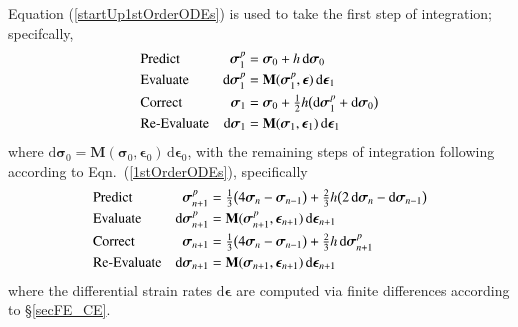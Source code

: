 Equation (\ref{startUp1stOrderODEs}) is used to take the first step of integration; specifcally, 
\begin{subequations}
    \notag
    \begin{align}
    \mbox{} & \text{Predict} & 
    \boldsymbol{\sigma}_1^p & = \boldsymbol{\sigma}_0 + h \, \mathrm{d} \boldsymbol{\sigma}_0 \\
    \mbox{} & \text{Evaluate} & 
    \mathrm{d} \boldsymbol{\sigma}^p_1 & = \mathbf{M} ( \boldsymbol{\sigma}_1^p ,
    \boldsymbol{\epsilon} ) \, \mathrm{d} \boldsymbol{\epsilon}_1 \\
    \mbox{} & \text{Correct} &
    \boldsymbol{\sigma}_1 & = \boldsymbol{\sigma}_0 + \tfrac{1}{2} h 
    \bigl( \mathrm{d} \boldsymbol{\sigma}_1^p + 
    \mathrm{d} \boldsymbol{\sigma}_0 \bigr) \\
    \mbox{} & \text{Re-Evaluate} & 
    \mathrm{d} \boldsymbol{\sigma}_1 & = \mathbf{M} ( \boldsymbol{\sigma}_1 , 
    \boldsymbol{\epsilon}_1) \, \mathrm{d} \boldsymbol{\epsilon}_1
    \end{align}
\end{subequations}
where $\mathrm{d} \boldsymbol{\sigma}_0 = \mathbf{M} ( \boldsymbol{\sigma}_0 , \boldsymbol{\epsilon}_0) \, \mathrm{d} \boldsymbol{\epsilon}_0$, with the remaining steps of integration following according to Eqn.~(\ref{1stOrderODEs}), specifically
\begin{subequations}
    \notag
    \begin{align}
    \mbox{} & \text{Predict} & 
    \boldsymbol{\sigma}_{n+1}^p & = \tfrac{1}{3} 
    \bigl( 4 \boldsymbol{\sigma}_n - \boldsymbol{\sigma}_{n-1} \bigr) + 
    \tfrac{2}{3} h \bigl( 2 \, \mathrm{d} \boldsymbol{\sigma}_n - 
    \mathrm{d} \boldsymbol{\sigma}_{n-1} \bigr) \\
    \mbox{} & \text{Evaluate} & 
    \mathrm{d} \boldsymbol{\sigma}^p_{n+1} & = \mathbf{M} ( \boldsymbol{\sigma}_{n+1}^p , \boldsymbol{\epsilon}_{n+1} ) \, 
    \mathrm{d} \boldsymbol{\epsilon}_{n+1} \\
    \mbox{} & \text{Correct} &
    \boldsymbol{\sigma}_{n+1} & = \tfrac{1}{3} 
    \bigl( 4 \boldsymbol{\sigma}_n - \boldsymbol{\sigma}_{n-1} \bigr) + 
    \tfrac{2}{3} h \, \mathrm{d} \boldsymbol{\sigma}^{p}_{n+1}  \\
    \mbox{} & \text{Re-Evaluate} & 
    \mathrm{d} \boldsymbol{\sigma}_{n+1} & = \mathbf{M} ( 
    \boldsymbol{\sigma}_{n+1} , \boldsymbol{\epsilon}_{n+1} )  \,
    \mathrm{d} \boldsymbol{\epsilon}_{n+1}
    \end{align}
\end{subequations} 
where the differential strain rates $\mathrm{d} \boldsymbol{\epsilon}$ are computed via finite differences according to \S\ref{secFE_CE}.


